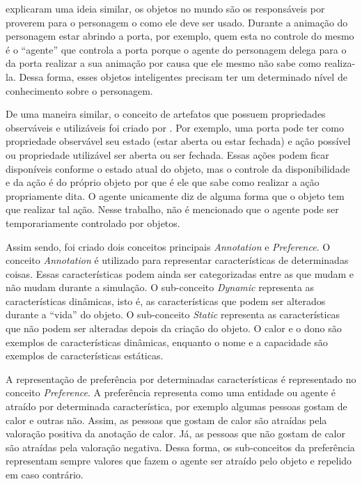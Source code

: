 \citet{kallmann1999modeling} explicaram uma ideia similar, os objetos no mundo
são os responsáveis por proverem para o personagem o como ele deve ser usado.
Durante a animação do personagem estar abrindo a porta, por exemplo, quem esta
no controle do mesmo é o ``agente'' que controla a porta porque o agente do
personagem delega para o da porta realizar a sua animação por causa que ele
mesmo não sabe como realiza-la. Dessa forma, esses objetos inteligentes
precisam ter um determinado nível de conhecimento sobre o personagem.

De uma maneira similar, o conceito de artefatos que possuem propriedades
observáveis e utilizáveis foi criado por \citet{ricci31cartago}. Por exemplo,
uma porta pode ter como propriedade observável seu estado (estar aberta ou
estar fechada) e ação possível ou propriedade utilizável ser aberta ou ser
fechada. Essas ações podem ficar disponíveis conforme o estado atual do
objeto, mas o controle da disponibilidade e da ação é do próprio objeto por
que é ele que sabe como realizar a ação propriamente dita. O agente unicamente
diz de alguma forma que o objeto tem que realizar tal ação. Nesse trabalho,
não é mencionado que o agente pode ser temporariamente controlado por
objetos.

Assim sendo, foi criado dois conceitos principais \emph{Annotation} e
\emph{Preference}. O conceito \emph{Annotation} é utilizado para representar
características de determinadas coisas. Essas características podem ainda
ser categorizadas entre as que mudam e não mudam durante a simulação. O
sub-conceito \emph{Dynamic} representa as características dinâmicas, isto é,
as características que podem ser alterados durante a ``vida'' do objeto. O
sub-conceito \emph{Static} representa as características que não podem ser
alteradas depois da criação do objeto. O calor e o dono são exemplos de
características dinâmicas, enquanto o nome e a capacidade são exemplos de
características estáticas.

A representação de preferência por determinadas características é representado
no conceito \emph{Preference}. A preferência representa como uma entidade ou
agente é atraído por determinada característica, por exemplo algumas pessoas
gostam de calor e outras não. Assim, as pessoas que gostam de calor são
atraídas pela valoração positiva da anotação de calor. Já, as pessoas que não
gostam de calor são atraídas pela valoração negativa. Dessa forma, os
sub-conceitos da preferência representam sempre valores que fazem o agente ser
atraído pelo objeto e repelido em caso contrário.

